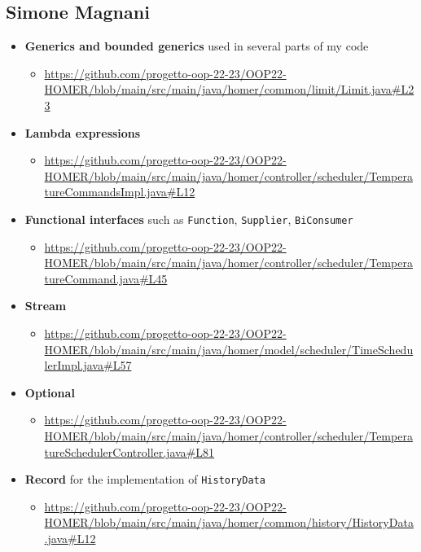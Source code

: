 \subsection{Simone Magnani}

\begin{itemize}
    \item \textbf{Generics and bounded generics} used in several parts of my code
    \begin{itemize}
        \item \url{https://github.com/progetto-oop-22-23/OOP22-HOMER/blob/main/src/main/java/homer/common/limit/Limit.java#L23}
    \end{itemize}
    \item \textbf{Lambda expressions}
    \begin{itemize}
        \item \url{https://github.com/progetto-oop-22-23/OOP22-HOMER/blob/main/src/main/java/homer/controller/scheduler/TemperatureCommandsImpl.java#L12}
    \end{itemize}
    \item \textbf{Functional interfaces} such as \texttt{Function}, \texttt{Supplier}, \texttt{BiConsumer}
    \begin{itemize}
        \item \url{https://github.com/progetto-oop-22-23/OOP22-HOMER/blob/main/src/main/java/homer/controller/scheduler/TemperatureCommand.java#L45}
    \end{itemize}
    \item \textbf{Stream}
    \begin{itemize}
        \item \url{https://github.com/progetto-oop-22-23/OOP22-HOMER/blob/main/src/main/java/homer/model/scheduler/TimeSchedulerImpl.java#L57}
    \end{itemize}
    \item \textbf{Optional}
    \begin{itemize}
        \item \url{https://github.com/progetto-oop-22-23/OOP22-HOMER/blob/main/src/main/java/homer/controller/scheduler/TemperatureSchedulerController.java#L81}
    \end{itemize}
    \item \textbf{Record} for the implementation of \texttt{HistoryData}
    \begin{itemize}
        \item \url{https://github.com/progetto-oop-22-23/OOP22-HOMER/blob/main/src/main/java/homer/common/history/HistoryData.java#L12}

\end{itemize}
\end{itemize}
